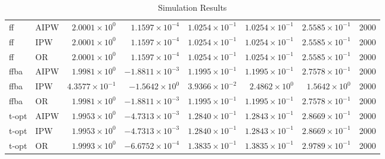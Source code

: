 \begin{table}[ht]
\begin{tabular}{llrrrrrr}
   \midrule
ff & AIPW & $2.0001 \times 10^{0}$ & $1.1597 \times 10^{-4}$ & $1.0254 \times 10^{-1}$ & $1.0254 \times 10^{-1}$ & $2.5585 \times 10^{-1}$ & 2000 \\ 
  ff & IPW & $2.0001 \times 10^{0}$ & $1.1597 \times 10^{-4}$ & $1.0254 \times 10^{-1}$ & $1.0254 \times 10^{-1}$ & $2.5585 \times 10^{-1}$ & 2000 \\ 
  ff & OR & $2.0001 \times 10^{0}$ & $1.1597 \times 10^{-4}$ & $1.0254 \times 10^{-1}$ & $1.0254 \times 10^{-1}$ & $2.5585 \times 10^{-1}$ & 2000 \\ 
   \midrule
ffba & AIPW & $1.9981 \times 10^{0}$ & $-1.8811 \times 10^{-3}$ & $1.1995 \times 10^{-1}$ & $1.1995 \times 10^{-1}$ & $2.7578 \times 10^{-1}$ & 2000 \\ 
  ffba & IPW & $4.3577 \times 10^{-1}$ & $-1.5642 \times 10^{0}$ & $3.9366 \times 10^{-2}$ & $2.4862 \times 10^{0}$ & $1.5642 \times 10^{0}$ & 2000 \\ 
  ffba & OR & $1.9981 \times 10^{0}$ & $-1.8811 \times 10^{-3}$ & $1.1995 \times 10^{-1}$ & $1.1995 \times 10^{-1}$ & $2.7578 \times 10^{-1}$ & 2000 \\ 
   \midrule
t-opt & AIPW & $1.9953 \times 10^{0}$ & $-4.7313 \times 10^{-3}$ & $1.2840 \times 10^{-1}$ & $1.2843 \times 10^{-1}$ & $2.8669 \times 10^{-1}$ & 2000 \\ 
  t-opt & IPW & $1.9953 \times 10^{0}$ & $-4.7313 \times 10^{-3}$ & $1.2840 \times 10^{-1}$ & $1.2843 \times 10^{-1}$ & $2.8669 \times 10^{-1}$ & 2000 \\ 
  t-opt & OR & $1.9993 \times 10^{0}$ & $-6.6752 \times 10^{-4}$ & $1.3835 \times 10^{-1}$ & $1.3835 \times 10^{-1}$ & $2.9789 \times 10^{-1}$ & 2000 \\ 
   \bottomrule
\end{tabular}
\caption{Simulation Results} 
\label{tab:results}
\end{table}

